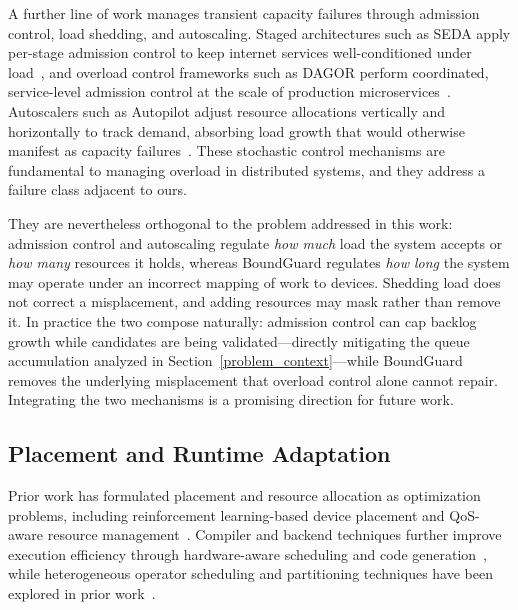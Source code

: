 \documentclass[conference]{IEEEtran}
\begin{document}
{A further line of work manages transient capacity failures through admission control, load shedding, and autoscaling.
Staged architectures such as SEDA apply per-stage admission control to keep internet services well-conditioned under load~\cite{seda2001sosp}, and overload control frameworks such as DAGOR perform coordinated, service-level admission control at the scale of production microservices~\cite{dagor2018socc}.
Autoscalers such as Autopilot adjust resource allocations vertically and horizontally to track demand, absorbing load growth that would otherwise manifest as capacity failures~\cite{autopilot2020eurosys}.
These stochastic control mechanisms are fundamental to managing overload in distributed systems, and they address a failure class adjacent to ours.

They are nevertheless orthogonal to the problem addressed in this work: admission control and autoscaling regulate \emph{how much} load the system accepts or \emph{how many} resources it holds, whereas BoundGuard regulates \emph{how long} the system may operate under an incorrect mapping of work to devices.
Shedding load does not correct a misplacement, and adding resources may mask rather than remove it.
In practice the two compose naturally: admission control can cap backlog growth while candidates are being validated---directly mitigating the queue accumulation analyzed in Section~\ref{problem_context}---while BoundGuard removes the underlying misplacement that overload control alone cannot repair.
Integrating the two mechanisms is a promising direction for future work.


\subsection{Placement and Runtime Adaptation}

Prior work has formulated placement and resource allocation as optimization problems, including reinforcement learning-based device placement and QoS-aware resource management~\cite{mirhoseini2017_deviceplacement, sinan2021asplos}.
Compiler and backend techniques further improve execution efficiency through hardware-aware scheduling and code generation~\cite{chen2018tvm, zheng2020ansor}, while heterogeneous operator scheduling and partitioning techniques have been explored in prior work~\cite{oh2025optimizing, yu2023partitiontuner}.

}
\end{document}
